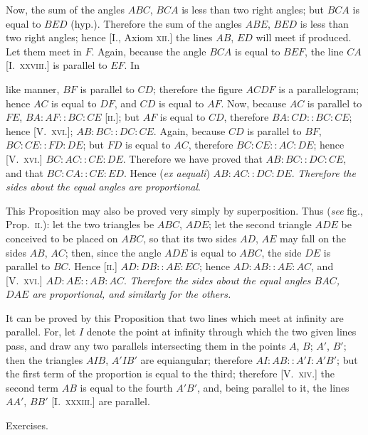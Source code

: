 \documentclass[oneside]{book}
\newcommand\exhead[1]{
\Needspace*{5\baselineskip}\begin{center}
\textsf{#1}
\end{center}
}
\begin{document}
Now, the sum of the angles
$ABC$, $BCA$ is less than two
right angles; but $BCA$ is equal
to $BED$ (hyp.). Therefore the sum of the angles $ABE$,
$BED$ is less than two right angles; hence [I., Axiom
\textsc{xii.}] the lines $AB$, $ED$ will meet if produced. Let them
meet in $F$. Again, because the angle $BCA$ is equal
to $BEF$, the line $CA$ [I.\ \textsc{xxviii.}] is parallel to $EF$. In

like manner, $BF$ is parallel to $CD$; therefore the figure
$ACDF$ is a parallelogram; hence $AC$ is equal to $DF$,
and $CD$ is equal to $AF$. Now, because $AC$ is parallel
to $FE$, $BA:AF :: BC:CE$ \textsc{[ii.]}; but $AF$ is equal to
$CD$, therefore $BA:CD :: BC:CE$; hence [V.~\textsc{xvi.}];
$AB:BC :: DC:CE$. Again, because $CD$ is parallel
to $BF$, $BC:CE :: FD:DE$; but $FD$ is equal to
$AC$, therefore $BC:CE :: AC:DE$; hence [V.~\textsc{xvi.}]
$BC:AC :: CE:DE$. Therefore we have proved that
$AB:BC :: DC:CE$, and that $BC:CA :: CE:ED$.
Hence (\emph{ex aequali}) $AB:AC :: DC:DE$. \emph{Therefore
the sides about the equal angles are proportional}.

\smallskip
\begin{footnotesize}
This Proposition may also be proved very simply by superposition.
Thus (\emph{see} fig., Prop.~\textsc{ii.}): let the two triangles be $ABC$,
$ADE$; let the second triangle $ADE$ be conceived to be placed on
$ABC$, so that its two sides $AD$, $AE$ may fall on the sides $AB$,
$AC$; then, since the angle $ADE$ is equal to $ABC$, the side $DE$
is parallel to $BC$. Hence \textsc{[ii.]} $AD:DB :: AE:EC$; hence
$AD:AB :: AE:AC$, and [V.~\textsc{xvi.}] $AD:AE :: AB:AC$.
\textit{Therefore the sides about the equal angles $BAC$, $DAE$ are
proportional, and similarly for the others.}

It can be proved by this Proposition that two lines which meet
at infinity are parallel. For, let $I$ denote the point at infinity
through which the two given lines pass, and draw any two parallels
intersecting them in the points $A$, $B$; $A'$, $B'$; then the
triangles $AIB$, $A'IB'$ are equiangular; therefore $AI:AB :: A'I:A'B'$;
but the first term of the proportion is equal to the third;
therefore [V.~\textsc{xiv.}] the second term $AB$ is equal to the fourth
$A'B'$, and, being parallel to it, the lines $AA'$, $BB'$ [I.~\textsc{xxxiii.}]
are parallel.
\par\end{footnotesize}

\exhead{Exercises.}
\end{document}
